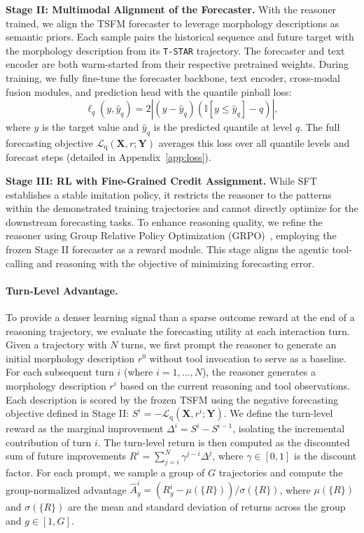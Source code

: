 \documentclass[11pt]{article}
\newcommand{\minisection}[1]{\vspace{5pt}\noindent\textbf{#1.}}
\begin{document}
\minisection{Stage II: Multimodal Alignment of the Forecaster}
With the reasoner trained, we align the TSFM forecaster to leverage morphology descriptions as semantic priors.
Each sample pairs the historical sequence and future target with the morphology description from its \texttt{T-STAR} trajectory.
The forecaster and text encoder are both warm-started from their respective pretrained weights.
During training, we fully fine-tune the forecaster backbone, text encoder, cross-modal fusion modules, and prediction head with the quantile pinball loss:
\begin{equation}\label{eq:pinball}
\ell_q(y, \hat{y}_q) = 2\left|(y - \hat{y}_q)\left(\mathbb{I}[y \leq \hat{y}_q] - q\right)\right|,
\end{equation}
where $y$ is the target value and $\hat{y}_q$ is the predicted quantile at level $q$.
The full forecasting objective $\mathcal{L}_{\mathrm{q}}(\mathbf{X}, r; \mathbf{Y})$ averages this loss over all quantile levels and forecast steps (detailed in Appendix~\ref{app:loss}).

\minisection{Stage III: RL with Fine-Grained Credit Assignment}
While SFT establishes a stable imitation policy, it restricts the reasoner to the patterns within the demonstrated training trajectories and cannot directly optimize for the downstream forecasting tasks.
To enhance reasoning quality, we refine the reasoner using Group Relative Policy Optimization (GRPO)~\citep{shao2024deepseekmath}, employing the frozen Stage II forecaster as a reward module.
This stage aligns the agentic tool-calling and reasoning with the objective of minimizing forecasting error.

\paragraph{Turn-Level Advantage.}
To provide a denser learning signal than a sparse outcome reward at the end of a reasoning trajectory, we evaluate the forecasting utility at each interaction turn.
Given a trajectory with $N$ turns, we first prompt the reasoner to generate an initial morphology description $r^0$ without tool invocation to serve as a baseline.
For each subsequent turn $i$ (where $i=1, \dots, N$), the reasoner generates a morphology description $r^i$ based on the current reasoning and tool observations.
Each description is scored by the frozen TSFM using the negative forecasting objective defined in Stage II: $S^i = -\mathcal{L}_{\mathrm{q}}(\mathbf{X}, r^i; \mathbf{Y})$.
We define the turn-level reward as the marginal improvement $\Delta^i = S^i - S^{i-1}$, isolating the incremental contribution of turn $i$.
The turn-level return is then computed as the discounted sum of future improvements $R^i = \sum_{j=i}^N \gamma^{j-i} \Delta^j$, where $\gamma \in [0,1]$ is the discount factor.
For each prompt, we sample a group of $G$ trajectories and compute the group-normalized advantage $\hat{A}^i_g = (R^i_g - \mu(\{R\})) / \sigma(\{R\})$, where $\mu(\{R\})$ and $\sigma(\{R\})$ are the mean and standard deviation of returns across the group and $g\in [1,G]$.
\end{document}
